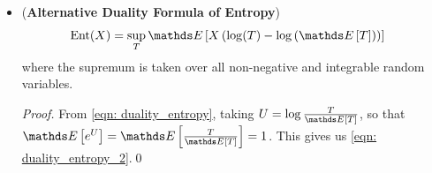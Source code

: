 \documentclass[11pt]{article}
\begin{document}
\begin{itemize}
\item  \begin{theorem} \label{thm: duality_entropy_2}(\textbf{Alternative Duality Formula of Entropy}) \citep{boucheron2013concentration}
\begin{align}
\text{Ent}(X) &= \sup_{T}\E{}{X\paren{\log(T) - \log\paren{\E{}{T}}}}  \label{eqn: duality_entropy_2}
\end{align} where the supremum is taken over all non-negative and integrable random variables.
\end{theorem}
\begin{proof}
From \eqref{eqn: duality_entropy}, taking $U = \log\frac{T}{\E{}{T}}$, so that $\E{}{e^U} = \E{}{\frac{T}{\E{}{T}}} = 1$. This gives us \eqref{eqn: duality_entropy_2}.\qed
\end{proof}


\end{itemize}
\end{document}
